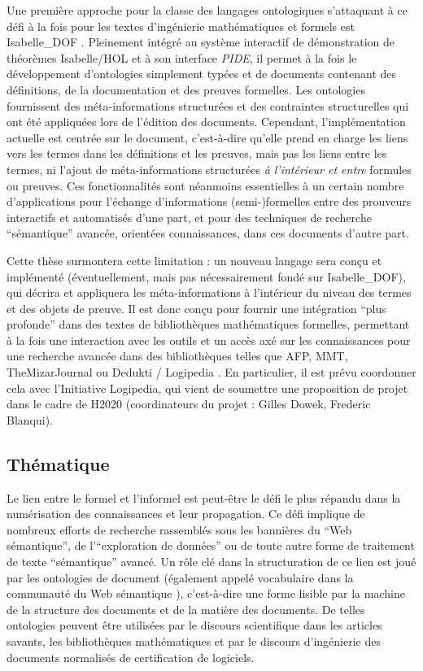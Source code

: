 \documentclass[a4paper,10pt]{article}
\begin{document}
Une première approche pour la classe des langages ontologiques
s'attaquant à ce défi
à la fois pour les textes d'ingénierie mathématiques et formels est
Isabelle\_DOF
\cite{
  Brucker-ea.Using-CICM18,
  BruckerWolff.Design-SEFM19,
  BruckerWolff.Certif-IFM19%
}.
Pleinement intégré
au système interactif de démonstration de théorèmes Isabelle/HOL
et à son interface \emph{PIDE},
il permet à la fois le développement d'ontologies simplement typées
et de documents contenant des définitions, de la documentation
et des preuves formelles.
Les ontologies fournissent des méta-informations structurées
et des contraintes structurelles
qui ont été appliquées lors de l'édition des documents.
Cependant, l'implémentation actuelle est centrée sur le document,
c'est-à-dire qu'elle prend en charge les liens vers les termes
dans les définitions et les preuves,
mais pas les liens entre les termes,
ni l'ajout de méta-informations structurées
\emph{à l'intérieur et entre} formules ou preuves.
Ces fonctionnalités sont néanmoins
essentielles à un certain nombre d'applications
pour l'échange d'informations (semi-)formelles
entre des prouveurs interactifs et automatisés d'une part,
et pour des techniques de recherche \enquote{sémantique} avancée,
orientées connaissances, dans ces documents d'autre part.

Cette thèse surmontera cette limitation :
un nouveau langage sera conçu et implémenté
(éventuellement, mais pas nécessairement fondé sur Isabelle\_DOF),
qui décrira et appliquera les méta-informations
à l'intérieur du niveau des termes et des objets de preuve.
Il est donc conçu pour fournir une intégration \enquote{plus profonde}
dans des textes de bibliothèques mathématiques formelles,
permettant à la fois une interaction avec les outils
et un accès axé sur les connaissances
pour une recherche avancée dans des bibliothèques
telles que AFP, MMT, TheMizarJournal ou Dedukti / Logipedia
\cite {afp,mmt,TheMizarJournal,dedukti}.
En particulier, il est prévu coordonner cela
avec l'Initiative Logipedia,
qui vient de soumettre une proposition de projet dans le cadre de H2020
(coordinateurs du projet : Gilles Dowek, Frederic Blanqui).

\subsection*{Thématique}

Le lien entre le formel et l'informel est peut-être
le défi le plus répandu dans la numérisation des connaissances
et leur propagation.
Ce défi implique de nombreux efforts de recherche
rassemblés sous les bannières du \enquote{Web sémantique},
de l'\enquote{exploration de données}
ou de toute autre forme de traitement de texte \enquote{sémantique} avancé.
Un rôle clé dans la structuration de ce lien est joué
par les ontologies de document
(également appelé vocabulaire dans la communauté du Web sémantique
\cite{owlgred}),
c'est-à-dire une forme lisible par la machine de la structure des documents
et de la matière des documents.
De telles ontologies peuvent être utilisées
par le discours scientifique dans les articles savants,
les bibliothèques mathématiques
et par le discours d'ingénierie des documents normalisés
de certification de logiciels.
\end{document}

